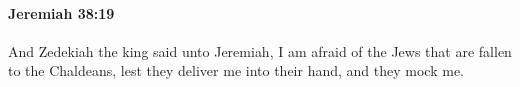 
		\paragraph{Jeremiah 38:19} %
			\label{JEREMIAH-38-19}

			And Zedekiah the king said unto Jeremiah, I am afraid of the Jews that are fallen to the Chaldeans, lest they deliver me into their hand, and they mock me.


